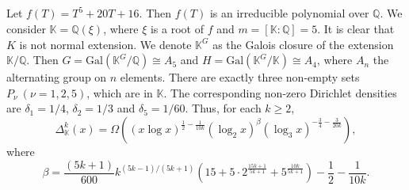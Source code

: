 \documentclass[reqno]{amsart}
\numberwithin{equation}{section}
\theoremstyle{plain}
\begin{document}
\subsection{} \label{Example 4} Let $f(T)= T^5+20T+16$. Then $f(T)$ is an irreducible polynomial over $\mathbb{Q}$. We consider $\mathbb{K}=\mathbb{Q}(\xi)$, where $\xi$ is a root of $f$ and $m=[\mathbb{K}: \mathbb{Q}]=5$. It is clear that $K$ is not normal extension. We denote $\mathbb{K}^{G}$ as the Galois closure of the extension $\mathbb{K}/\mathbb{Q}$. Then $G= \text{Gal}(\mathbb{K}^{G}/\mathbb{Q}) \cong A_5$ and $H= \text{Gal}(\mathbb{K}^{G}/\mathbb{K})\cong A_4$,  where $A_n$ the alternating group on $n$ elements.
There are exactly three non-empty sets $P_{\nu} \ (\nu =1,2,5)$, which are in $\mathbb{K}$. The corresponding non-zero Dirichlet densities are $\delta_1 = 1/4$, $\delta_2 = 1/3$ and $\delta_5 =1/60$. Thus, for each $k\geq 2$, 
\begin{equation*}
	\Delta_{\mathbb{K}}^{k}(x) = \Omega\left( (x\log x)^{\frac{1}{2}-\frac{1}{10k}} (\log_2 x)^{\beta} (\log_3 x)^{-\frac{3}{4}- \frac{3}{20k}}\right),
\end{equation*}
where 
\begin{equation*}
	\beta = \frac{(5k+1)}{600}k^{(5k-1)/(5k+1)}\left( 15+ 5\cdot 2^{\frac{15k+1}{5k+1}}+ 5^{\frac{10k}{5k+1}}\right) -\frac{1}{2} - \frac{1}{10k}.
\end{equation*}







\end{document}
